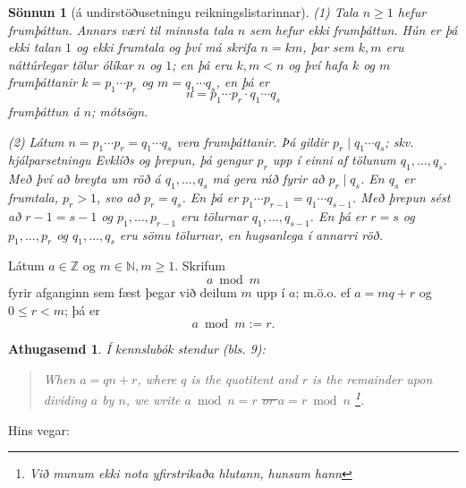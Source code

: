 \documentclass[a4paper,icelandic,11pt]{book}
\theoremstyle{plain}
\newtheorem*{ath}{Athugasemd}
\newtheorem*{sonnun}{Sönnun}
\newcommand{\N}{\mathbb{N}}
\newcommand{\Z}{\mathbb{Z}}
\begin{document}
\begin{sonnun}[á undirstöðusetningu reikningslistarinnar]
  (1) Tala $n\ge 1$ hefur frumþáttun. Annars væri til \emph{minnsta} tala $n$
  sem hefur ekki frumþáttun. Hún er þá ekki talan $1$ og ekki frumtala og því
  má skrifa $n = km$, þar sem $k,m$ eru náttúrlegar tölur ólíkar $n$ og $1$;
  en þá eru $k,m < n$ og því hafa $k$ og $m$ frumþáttanir $k = p_1 \cdots p_r$
  og $m = q_1 \cdots q_s$, en þá er
  \[ n = p_1 \cdots p_r \cdot q_1 \cdots q_s \]
  frumþáttun á $n$; mótsögn.
  
  (2) Látum $n = p_1 \cdots p_r = q_1 \cdots q_s$ vera frumþáttanir. Þá gildir
  $p_r \mid q_1 \cdots q_s$; skv. hjálparsetningu Evklíðs og þrepun, þá gengur
  $p_r$ upp í einni af tölunum $q_1,\dots,q_s$. Með því að breyta um röð á
  $q_1, \dots, q_s$ má gera ráð fyrir að $p_r \mid q_s$. En $q_s$ er frumtala,
  $p_r > 1$, svo að $p_r = q_s$. En þá er $p_1 \cdots p_{r-1} = q_1 \cdots
  q_{s-1}$. Með þrepun sést að $r - 1 = s - 1$ og $p_1, \dots, p_{r-1}$ eru
  tölurnar $q_1, \dots, q_{s-1}$. En þá er $r = s$ og $p_1, \dots, p_r$ og
  $q_1, \dots, q_s$ eru sömu tölurnar, en hugsanlega í annarri röð.
\end{sonnun}
Látum $a\in\Z$ og $m\in\N,m\ge 1$. Skrifum \[ a\bmod m \] fyrir afganginn sem
fæst þegar við deilum $m$ upp í $a$; m.ö.o. ef $a = mq+r$ og $0\le r < m$; þá
er \[ a\bmod m := r .\]
\begin{ath}
  Í kennslubók stendur (bls. 9):
  \begin{quote}
    When $a = qn+r$, where $q$ is the quotitent and $r$ is the remainder upon
    dividing $a$ by $n$, we write $a\bmod n = r$ \sout{or $a=r\bmod n$}
    \footnote{Við munum ekki nota yfirstrikaða hlutann, hunsum hann}.
  \end{quote}
\end{ath}
Hins vegar:
\end{document}
